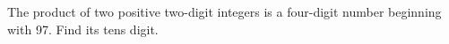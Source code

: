 The product of two positive two-digit integers is a four-digit number beginning with 97. Find its tens digit.

